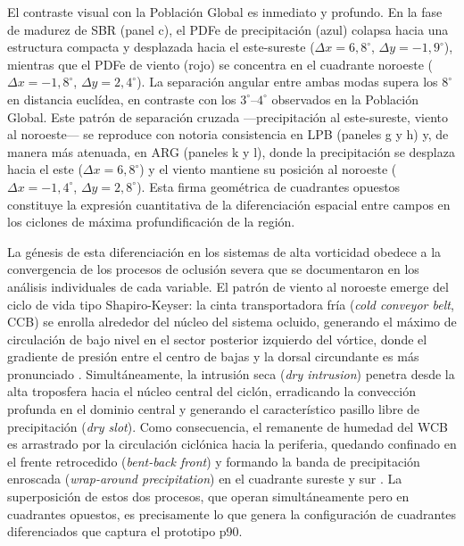El contraste visual con la Población Global es inmediato y profundo. En la fase de madurez de SBR (panel c), el PDFe de precipitación (azul) colapsa hacia una estructura compacta y desplazada hacia el este-sureste ($\Delta x = 6{,}8^{\circ}$, $\Delta y = -1{,}9^{\circ}$), mientras que el PDFe de viento (rojo) se concentra en el cuadrante noroeste ($\Delta x = -1{,}8^{\circ}$, $\Delta y = 2{,}4^{\circ}$). La separación angular entre ambas modas supera los $8^{\circ}$ en distancia euclídea, en contraste con los $3^{\circ}$--$4^{\circ}$ observados en la Población Global. Este patrón de separación cruzada —precipitación al este-sureste, viento al noroeste— se reproduce con notoria consistencia en LPB (paneles g y h) y, de manera más atenuada, en ARG (paneles k y l), donde la precipitación se desplaza hacia el este ($\Delta x = 6{,}8^{\circ}$) y el viento mantiene su posición al noroeste ($\Delta x = -1{,}4^{\circ}$, $\Delta y = 2{,}8^{\circ}$). Esta firma geométrica de cuadrantes opuestos constituye la expresión cuantitativa de la diferenciación espacial entre campos en los ciclones de máxima profundificación de la región.

La génesis de esta diferenciación en los sistemas de alta vorticidad obedece a la convergencia de los procesos de oclusión severa que se documentaron en los análisis individuales de cada variable. El patrón de viento al noroeste emerge del ciclo de vida tipo Shapiro-Keyser: la cinta transportadora fría (\textit{cold conveyor belt}, CCB) se enrolla alrededor del núcleo del sistema ocluido, generando el máximo de circulación de bajo nivel en el sector posterior izquierdo del vórtice, donde el gradiente de presión entre el centro de bajas y la dorsal circundante es más pronunciado \citep{schultz2021antecedents}. Simultáneamente, la intrusión seca (\textit{dry intrusion}) penetra desde la alta troposfera hacia el núcleo central del ciclón, erradicando la convección profunda en el dominio central y generando el característico pasillo libre de precipitación (\textit{dry slot}). Como consecuencia, el remanente de humedad del WCB es arrastrado por la circulación ciclónica hacia la periferia, quedando confinado en el frente retrocedido (\textit{bent-back front}) y formando la banda de precipitación enroscada (\textit{wrap-around precipitation}) en el cuadrante sureste y sur \citep{shapiro1990life}. La superposición de estos dos procesos, que operan simultáneamente pero en cuadrantes opuestos, es precisamente lo que genera la configuración de cuadrantes diferenciados que captura el prototipo p90.

